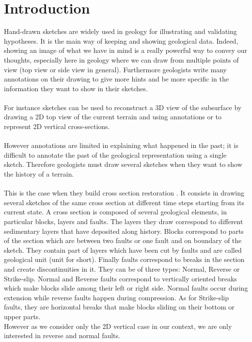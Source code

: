 \documentclass[12pt, a4paper]{report} %
\begin{document}
\chapter{Introduction}
\label{ch:intro}
Hand-drawn sketches are widely used in geology for illustrating and validating hypotheses. It is the main way of keeping and showing geological data. Indeed, showing an image of what we have in mind is a really powerful way to convey our thoughts, especially here in geology where we can draw from multiple points of view (top view or side view in general). Furthermore geologists write many annotations on their drawing to give more hints and be more specific in the information they want to show in their sketches.\\\\
For instance sketches can be used to reconstruct a 3D view of the subsurface by drawing a 2D top view of the current terrain and using annotations \cite{brazil} or to represent 2D vertical cross-sections. \\\\
However annotations are limited in explaining what happened in the past; it is difficult to annotate the past of the geological representation using a single sketch. Therefore geologists must draw several sketches when they want to show the history of a terrain. \\\\
This is the case when they build cross section restoration \cite{SectionRestoration}. It consists in drawing several sketches of the same cross section at different time steps starting from its current state. A cross section is composed of several geological elements, in particular blocks, layers and faults. The layers they draw correspond to different sedimentary layers that have deposited  along history. Blocks correspond to parts of the section which are between two faults or one fault and on boundary of the sketch. They contain part of layers which have been cut by faults and are called geological unit (unit for short).
Finally faults correspond to breaks in the section and create discontinuities in it. They can be of three types:
Normal, Reverse or Strike-slip. Normal and Reverse faults correspond to vertically oriented breaks which make blocks slide among their left or right side. Normal faults occur during extension while reverse faults happen during compression. As for Strike-slip faults, they are horizontal breaks that make blocks sliding on their bottom or upper parts.\\
However as we consider only the 2D vertical case in our context, we are only interested in reverse and normal faults.\\\\
\end{document}

